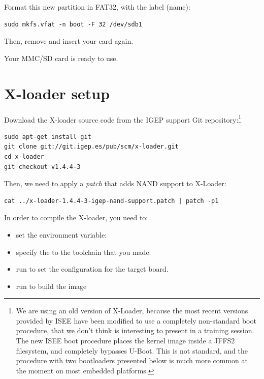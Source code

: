 Format this new partition in FAT32, with the  label (name):

\begin{verbatim}
sudo mkfs.vfat -n boot -F 32 /dev/sdb1
\end{verbatim}

Then, remove and insert your card again.

Your MMC/SD card is ready to use.

\section{X-loader setup}

Download the X-loader source code from the IGEP support Git
repository:\footnote{We are using an old version of X-Loader, because
  the most recent versions provided by ISEE have been modified to use
  a completely non-standard boot procedure, that we don't think is
  interesting to present in a training session. The new ISEE boot
  procedure places the kernel image inside a JFFS2 filesystem, and
  completely bypasses U-Boot. This is not standard, and the procedure
  with two bootloaders presented below is much more common at the
  moment on most embedded platforms.}

\begin{verbatim}
sudo apt-get install git
git clone git://git.igep.es/pub/scm/x-loader.git
cd x-loader
git checkout v1.4.4-3
\end{verbatim}

Then, we need to apply a {\em patch} that adds NAND support to
X-Loader:

\begin{verbatim}
cat ../x-loader-1.4.4-3-igep-nand-support.patch | patch -p1
\end{verbatim}

In order to compile the X-loader, you need to:
\begin{itemize}

\item set the  environment variable:\\

\item specify the  to the toolchain that you made:\\

\item run  to set the configuration
  for the target board.

\item run  to build the image

\end{itemize}

